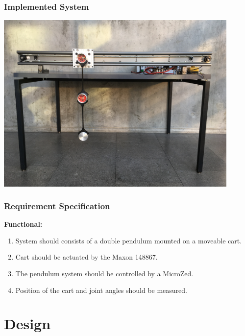 \documentclass[mathserif]{beamer}
\begin{document}
\begin{frame}[c]\frametitle{Implemented System}
\centering
\includegraphics[width=0.9\textwidth]{graphics/full_system_finish}
\end{frame}

\begin{frame}[c]\frametitle{Requirement Specification}

\textbf{Functional:}
\begin{enumerate}
	\item System should consists of a double pendulum mounted on a moveable cart.
	\item Cart should be actuated by the Maxon 148867. 
	\item The pendulum system should be controlled by a MicroZed.
	\item \alert<2>{Position of the cart and joint angles should be measured.}
\end{enumerate}

\end{frame}

\section{Design}
\end{document}
